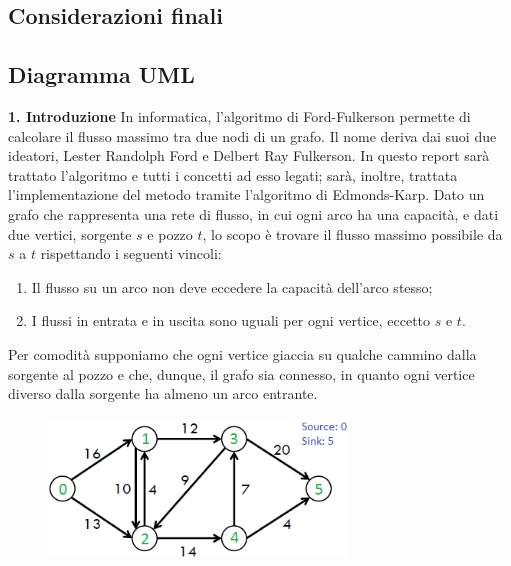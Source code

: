 \documentclass{article}
\begin{document}
\subsection{Considerazioni finali}
\subsection{Diagramma UML}


\newpage
\begin{flushleft}
\huge \textbf{1. Introduzione}
\newline
\newline
\normalsize
In informatica, l'algoritmo di Ford-Fulkerson permette di calcolare il flusso massimo tra due nodi di un grafo. Il nome deriva dai suoi due ideatori, Lester Randolph Ford e Delbert Ray Fulkerson. In questo report sarà trattato l'algoritmo e tutti i concetti ad esso legati; sarà, inoltre, trattata l'implementazione del metodo tramite l'algoritmo di Edmonds-Karp.
\newline
Dato un grafo che rappresenta una rete di flusso, in cui ogni arco ha una capacità, e dati due vertici, sorgente $s$ e pozzo $t$, lo scopo è trovare il flusso massimo possibile da $s$ a $t$ rispettando i seguenti vincoli:
\begin{enumerate} 
\item Il flusso su un arco non deve eccedere la capacità dell'arco stesso; 
\item I flussi in entrata e in uscita sono uguali per ogni vertice, eccetto $s$ e $t$.
\end{enumerate}
Per comodità supponiamo che ogni vertice giaccia su qualche cammino dalla sorgente al pozzo e che, dunque, il grafo sia connesso, in quanto ogni vertice diverso dalla sorgente ha almeno un arco entrante.
\end{flushleft}
\begin{figure}[h!]
\begin{center}
  \includegraphics[width=8cm]{ciao.png}\\
\end{center}
\end{figure}
\end{document}
